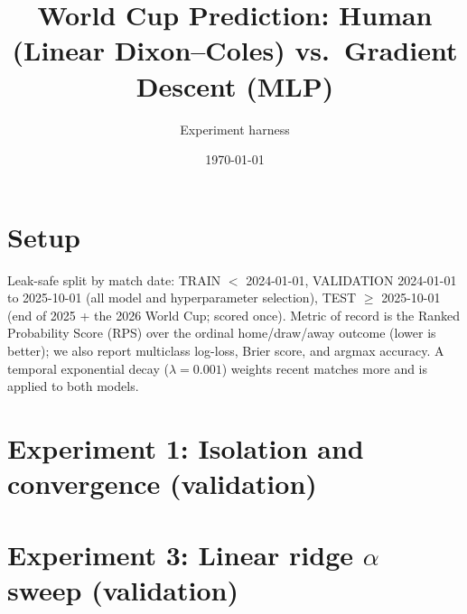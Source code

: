 \documentclass{article}
\title{World Cup Prediction: Human (Linear Dixon--Coles) vs.\ Gradient Descent (MLP)}
\author{Experiment harness}
\date{\today}
\begin{document}
\maketitle
\section{Setup}
Leak-safe split by match date: TRAIN $<$ 2024-01-01, VALIDATION 2024-01-01 to 2025-10-01 (all model and hyperparameter selection), TEST $\geq$ 2025-10-01 (end of 2025 + the 2026 World Cup; scored once). Metric of record is the Ranked Probability Score (RPS) over the ordinal home/draw/away outcome (lower is better); we also report multiclass log-loss, Brier score, and argmax accuracy. A temporal exponential decay ($\lambda=0.001$) weights recent matches more and is applied to both models.

\section*{Experiment 1: Isolation and convergence (validation)}
\begin{table}[h!]
\centering
{}
\caption{Experiment 1: Isolation and convergence (validation)}
\end{table}

\section*{Experiment 3: Linear ridge $\alpha$ sweep (validation)}
\begin{table}[h!]
\centering
{}
\caption{Experiment 3: Linear ridge $\alpha$ sweep (validation)}
\end{table}
\end{document}
